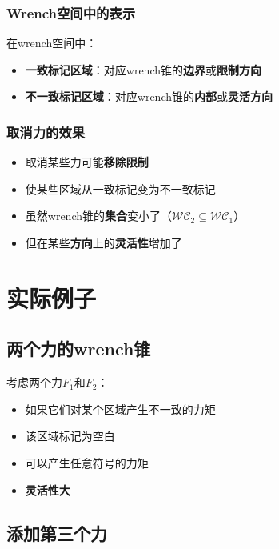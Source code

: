 \documentclass[12pt,a4paper]{article}
\begin{document}
\subsubsection{Wrench空间中的表示}

在wrench空间中：

\begin{itemize}
    \item \textbf{一致标记区域}：对应wrench锥的\textbf{边界}或\textbf{限制方向}
    \item \textbf{不一致标记区域}：对应wrench锥的\textbf{内部}或\textbf{灵活方向}
\end{itemize}

\subsubsection{取消力的效果}

\begin{itemize}
    \item 取消某些力可能\textbf{移除限制}
    \item 使某些区域从一致标记变为不一致标记
    \item 虽然wrench锥的\textbf{集合}变小了（$\mathcal{WC}_2 \subseteq \mathcal{WC}_1$）
    \item 但在某些\textbf{方向}上的\textbf{灵活性}增加了
\end{itemize}

\section{实际例子}

\subsection{两个力的wrench锥}

考虑两个力$F_1$和$F_2$：

\begin{itemize}
    \item 如果它们对某个区域产生不一致的力矩
    \item 该区域标记为空白
    \item 可以产生任意符号的力矩
    \item \textbf{灵活性大}
\end{itemize}

\subsection{添加第三个力}
\end{document}
